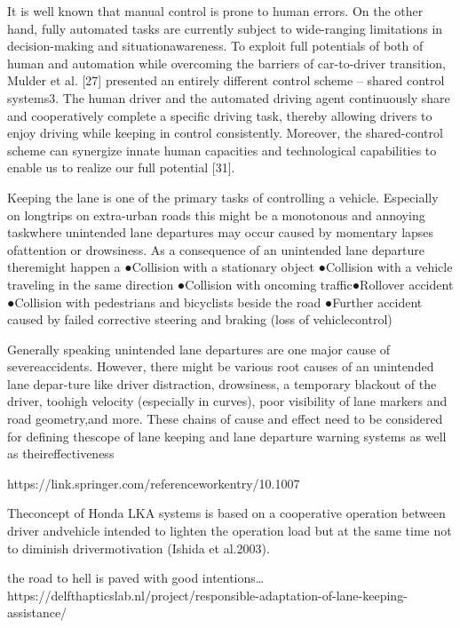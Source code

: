It is well known that manual control is prone to human errors. On the other hand, fully automated tasks are currently subject to wide-ranging limitations in decision-making and situationawareness. To exploit full potentials of both of human and automation while overcoming the barriers of car-to-driver transition, Mulder et al. [27] presented an entirely different control scheme – shared control systems3. The human driver and the automated driving agent continuously share and cooperatively complete a specific driving task, thereby allowing drivers to enjoy driving while keeping in control consistently. Moreover, the shared-control scheme can synergize innate human capacities and technological capabilities to enable us to realize our full potential [31].



Keeping the lane is one of the primary tasks of controlling a vehicle. Especially on longtrips  on  extra-urban  roads  this  might  be  a  monotonous  and  annoying  taskwhere unintended lane departures may occur caused  by momentary lapses  ofattention or drowsiness. As a consequence of an unintended lane departure theremight happen a
●Collision with a stationary object
●Collision with a vehicle traveling in the same direction
●Collision with oncoming traffic●Rollover accident
●Collision with pedestrians and bicyclists beside the road
●Further accident caused by failed corrective steering and braking (loss of vehiclecontrol)

Generally speaking unintended lane departures are one major cause of severeaccidents. However, there might be various root causes of an unintended lane depar-ture like driver distraction, drowsiness, a temporary blackout of the driver, toohigh velocity (especially in curves), poor visibility of lane markers and road geometry,and more. These chains of cause and effect need to be considered for defining thescope  of  lane  keeping  and  lane  departure  warning  systems  as  well  as  theireffectiveness

https://link.springer.com/referenceworkentry/10.1007%

Theconcept of Honda LKA systems is based on a cooperative operation between driver andvehicle intended to lighten the operation load but at the same time not to diminish drivermotivation (Ishida et al.2003).


the road to hell is paved with good intentions…
https://delfthapticslab.nl/project/responsible-adaptation-of-lane-keeping-assistance/

